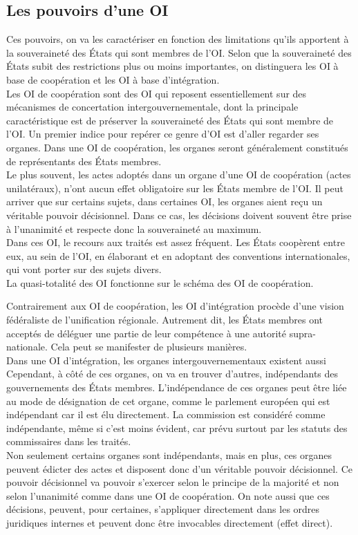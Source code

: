 \documentclass[10pt, a4paper, openany]{book}
\begin{document}
\subsection{Les pouvoirs d'une OI}

Ces pouvoirs, on va les caractériser en fonction des limitations qu'ils apportent à la souveraineté des États qui sont membres de l'OI. Selon que la souveraineté des États subit des restrictions plus ou moins importantes, on distinguera les OI à base de coopération et les OI à base d'intégration. \\
Les OI de coopération sont des OI qui reposent essentiellement sur des mécanismes de concertation intergouvernementale, dont la principale caractéristique est de préserver la souveraineté des États qui sont membre de l'OI. Un premier indice pour repérer ce genre d'OI est d'aller regarder ses organes. Dans une OI de coopération, les organes seront généralement constitués de représentants des États membres. \\
Le plus souvent, les actes adoptés dans un organe d'une OI de coopération (actes unilatéraux), n'ont aucun effet obligatoire sur les États membre de l'OI. Il peut arriver que sur certains sujets, dans certaines OI, les organes aient reçu un véritable pouvoir décisionnel. Dans ce cas, les décisions doivent souvent être prise à l'unanimité et respecte donc la souveraineté au maximum. \\
Dans ces OI, le recours aux traités est assez fréquent. Les États coopèrent entre eux, au sein de l'OI, en élaborant et en adoptant des conventions internationales, qui vont porter sur des sujets divers. \\
La quasi-totalité des OI fonctionne sur le schéma des OI de coopération. 


Contrairement aux OI de coopération, les OI d'intégration procède d'une vision fédéraliste de l'unification régionale. Autrement dit, les États membres ont acceptés de déléguer une partie de leur compétence à une autorité supra-nationale. Cela peut se manifester de plusieurs manières. \\
Dans une OI d'intégration, les organes intergouvernementaux existent aussi Cependant, à côté de ces organes, on va en trouver d'autres, indépendants des gouvernements des États membres. L'indépendance de ces organes peut être liée au mode de désignation de cet organe, comme le parlement européen qui est indépendant car il est élu directement. La commission est considéré comme indépendante, même si c'est moins évident, car prévu surtout par les statuts des commissaires dans les traités. \\
Non seulement certains organes sont indépendants, mais en plus, ces organes peuvent édicter des actes et disposent donc d'un véritable pouvoir décisionnel. Ce pouvoir décisionnel va pouvoir s'exercer selon le principe de la majorité et non selon l'unanimité comme dans une OI de coopération. On note aussi que ces décisions, peuvent, pour certaines, s'appliquer directement dans les ordres juridiques internes et peuvent donc être invocables directement (effet direct). 
\end{document}

